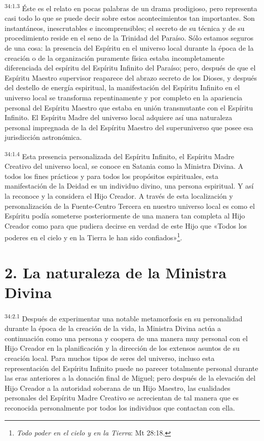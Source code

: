 \par
\textsuperscript{34:1.3} Éste es el relato en pocas palabras de un drama prodigioso, pero representa casi todo lo que se puede decir sobre estos acontecimientos tan importantes. Son instantáneos, inescrutables e incomprensibles; el secreto de su técnica y de su procedimiento reside en el seno de la Trinidad del Paraíso. Sólo estamos seguros de una cosa: la presencia del Espíritu en el universo local durante la época de la creación o de la organización puramente física estaba incompletamente diferenciada del espíritu del Espíritu Infinito del Paraíso; pero, después de que el Espíritu Maestro supervisor reaparece del abrazo secreto de los Dioses, y después del destello de energía espiritual, la manifestación del Espíritu Infinito en el universo local se transforma repentinamente y por completo en la apariencia personal del Espíritu Maestro que estaba en unión transmutante con el Espíritu Infinito. El Espíritu Madre del universo local adquiere así una naturaleza personal impregnada de la del Espíritu Maestro del superuniverso que posee esa jurisdicción astronómica.

\par
\textsuperscript{34:1.4} Esta presencia personalizada del Espíritu Infinito, el Espíritu Madre Creativo del universo local, se conoce en Satania como la Ministra Divina. A todos los fines prácticos y para todos los propósitos espirituales, esta manifestación de la Deidad es un individuo divino, una persona espiritual. Y así la reconoce y la considera el Hijo Creador. A través de esta localización y personalización de la Fuente-Centro Tercera en nuestro universo local es como el Espíritu podía someterse posteriormente de una manera tan completa al Hijo Creador como para que pudiera decirse en verdad de este Hijo que «Todos los poderes en el cielo y en la Tierra le han sido confiados»\footnote{\textit{Todo poder en el cielo y en la Tierra}: Mt 28:18.}.

\section*{2. La naturaleza de la Ministra Divina}
\par
\textsuperscript{34:2.1} Después de experimentar una notable metamorfosis en su personalidad durante la época de la creación de la vida, la Ministra Divina actúa a continuación como una persona y coopera de una manera muy personal con el Hijo Creador en la planificación y la dirección de los extensos asuntos de su creación local. Para muchos tipos de seres del universo, incluso esta representación del Espíritu Infinito puede no parecer totalmente personal durante las eras anteriores a la donación final de Miguel; pero después de la elevación del Hijo Creador a la autoridad soberana de un Hijo Maestro, las cualidades personales del Espíritu Madre Creativo se acrecientan de tal manera que es reconocida personalmente por todos los individuos que contactan con ella.

